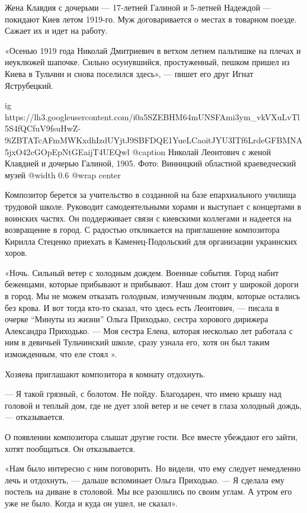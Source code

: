 Жена Клавдия с дочерьми — 17-летней Галиной и 5-летней Надеждой — покидают Киев
летом 1919-го. Муж договаривается о местах в товарном поезде. Сажает их и идет
на работу.

«Осенью 1919 года Николай Дмитриевич в ветхом летнем пальтишке на плечах и
неуклюжей шапочке. Сильно осунувшийся, простуженный, пешком пришел из Киева в
Тульчин и снова поселился здесь», — пишет его друг Игнат Яструбецкий.

\ifcmt
  ig https://lh3.googleusercontent.com/i0a5SZEBHM64mUNSFAmi3ym_vkVXuLvTl5S4fQCfuV9fsuHwZ-9iZBTATcAFmMWKxdhIzdUYjtJ9SBFDQE1YueLCaoitJYU3ITf6LrdeGFBMNA5jxO42cGOpEpNtGEaijT4UEQwl
	@caption Николай Леонтович с женой Клавдией и дочерью Галиной, 1905. Фото: Винницкий областной краеведческий музей
	@width 0.6
	@wrap center
\fi

Композитор берется за учительство в созданной на базе епархиального училища
трудовой школе. Руководит самодеятельными хорами и выступает с концертами в
воинских частях. Он поддерживает связи с киевскими коллегами и надеется на
возвращение в город. С радостью откликается на приглашение композитора Кирилла
Стеценко приехать в Каменец-Подольский для организации украинских хоров.

«Ночь. Сильный ветер с холодным дождем. Военные события. Город набит беженцами,
которые прибывают и прибывают. Наш дом стоит у широкой дороги в город. Мы не
можем отказать голодным, измученным людям, которые остались без крова. И вот
тогда кто-то сказал, что здесь есть Леонтович, — писала в очерке \enquote{Минуты из
жизни} Ольга Приходько, сестра хорового дирижера Александра Приходько. — Моя
сестра Елена, которая несколько лет работала с ним в девичьей Тульчинский
школе, сразу узнала его, хотя он был таким изможденным, что еле стоял ».

Хозяева приглашают композитора в комнату отдохнуть.

— Я такой грязный, с болотом. Не пойду. Благодарен, что имею крышу над головой
и теплый дом, где не дует злой ветер и не сечет в глаза холодный дождь, —
отказывается.

О появлении композитора слышат другие гости. Все вместе убеждают его зайти,
хотят пообщаться. Он отказывается.

«Нам было интересно с ним поговорить. Но видели, что ему следует немедленно
лечь и отдохнуть, — дальше вспоминает Ольга Приходько. — Я сделала ему постель
на диване в столовой. Мы все разошлись по своим углам. А утром его уже не было.
Когда и куда он ушел, не сказал».

